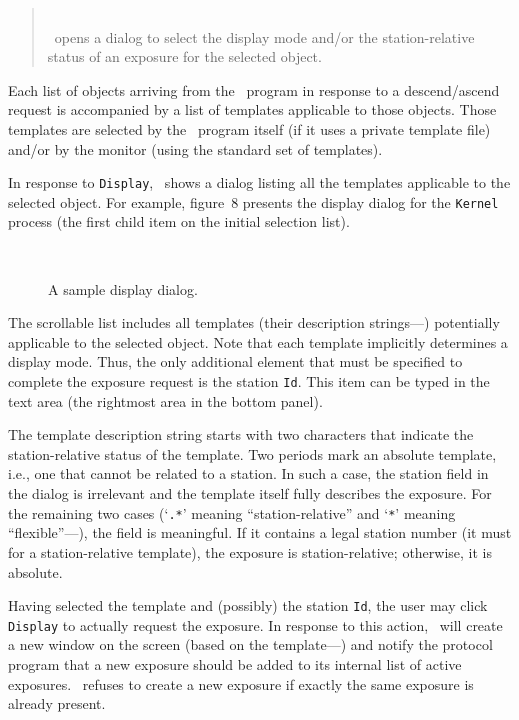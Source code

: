 \begin{quote}
\noindent{}\\ \hspace{0in}
\dsd\ opens a dialog to select the display mode and/or the station-relative
status of an exposure for the selected object.
\end{quote}
\medskip

Each list of objects arriving from the \smurph\ program in response to a
descend/ascend request is accompanied by a list of templates applicable to
those objects.
Those templates are selected by the \smurph\ program itself (if it uses a
private template file) and/or by the monitor (using the standard set of
templates).

In response to {\tt Display}, \dsd\ shows a dialog listing all the templates
applicable to the selected object.
For example,
figure~8
presents the display dialog for the {\tt Kernel}
process (the first child item on the initial selection list).

\begin{figure}
\begin{center}
\ 
\caption{A sample display dialog.}%
\end{center}
\end{figure}

The scrollable list includes all templates (their description
strings---) potentially applicable to the selected object.
Note that each template implicitly determines a display mode.
Thus, the only additional
element that must be specified to complete the exposure request is
the station {\tt Id}.
This item can be typed in the text area (the rightmost area
in the bottom panel).

The template description string starts with two characters that indicate the
station-relative status of the template.
Two periods mark an absolute template, i.e., one that cannot be related to
a station.
In such a case, the station field in the dialog is irrelevant and the template
itself fully describes the exposure.
For the remaining two cases (`{\tt .*}' meaning ``station-relative'' and
`{\tt **}' meaning ``flexible''---),
the field is meaningful.
If it contains a legal station number (it must for a station-relative
template), the exposure is station-relative; otherwise, it is absolute.

Having selected the template and (possibly) the station {\tt Id},
the user may click {\tt Display} to actually request the exposure.
In response to this action, \dsd\ will create a new window on the screen
(based on the template---) and notify
the protocol program that a new exposure should be added to its internal
list of active exposures.
\dsd\ refuses to create a new exposure
if exactly the same exposure is already present.

